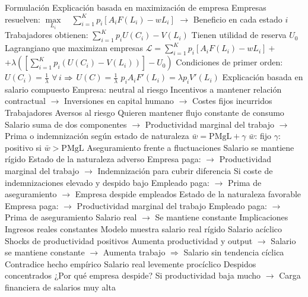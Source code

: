 \documentclass{nuevotema}
\begin{document}
\begin{esquemal}
		\2 Formulación
			\3 Explicación basada en maximización de empresa
				\4 Empresas resuelven:
				\4[] $\underset{L_i}{\max} \quad \sum_{i=1}^K p_i \left[ A_i F(L_i) - w L_i \right]$
				\4[] $\to$ Beneficio en cada estado $i$
				\4 Trabajadores obtienen:
				\4[] $\sum_{i=1}^K p_i U(C_i) - V(L_i) $
				\4[] Tienen utilidad de reserva $U_0$
				\4 Lagrangiano que maximizan empresas
				\4[] $\mathcal{L} = \sum_{i=1}^K p_i \left[ A_i F(L_i) - w L_i \right] +$
				\4[] $ + \lambda \left( \left[ \sum_{i=1}^K p_i ( U(C_i) - V(L_i) ) \right] - U_0 \right)$
				\4 Condiciones de primer orden:
				\4[] $U(C_i) = \frac{1}{\lambda}$ $\forall \, i$ $\then$ $U(C) = \frac{1}{\lambda}$
				\4[] $p_i A_i F'(L_i) = \lambda p_i V' (L_i)$
				\4[] 
			\3 Explicación basada en salario compuesto
				\4 Empresa:
				\4[] neutral al riesgo
				\4[] Incentivos a mantener relación contractual
				\4[] $\to$ Inversiones en capital humano
				\4[] $\to$ Costes fijos incurridos
				\4 Trabajadores
				\4[] Aversos al riesgo
				\4[] Quieren mantener flujo constante de consumo
				\4 Salario suma de dos componentes
				\4[] $\to$ Productividad marginal del trabajo
				\4[] $\to$ Prima o indemnización según estado de naturaleza
				\4[$\Rightarrow$] $\bar{w} = \text{PMgL} + \gamma$
				\4[] $\bar{w}$: fijo
				\4[] $\gamma$: positivo si $\bar{w} > \text{PMgL}$
				\4[$\then$] Aseguramiento frente a fluctuaciones
				\4[$\then$] Salario se mantiene rígido
				\4 Estado de la naturaleza adverso
				\4[] Empresa paga:
				\4[] $\to$ Productividad marginal del trabajo
				\4[] $\to$ Indemnización para cubrir diferencia
				\4[] Si coste de indemnizaciones elevado y despido bajo
				\4[] Empleado paga:
				\4[] $\to$ Prima de aseguramiento
				\4[] $\to$ Empresa despide empleados
				\4 Estado de la naturaleza favorable
				\4[] Empresa paga:
				\4[] $\to$ Productividad marginal del trabajo
				\4[] Empleado paga:
				\4[] $\to$ Prima de aseguramiento
				\4[] Salario real
				\4[] $\to$ Se mantiene constante
		\2 Implicaciones
			\3 Ingresos reales constantes
				\4 Modelo muestra salario real rígido
			\3 Salario acíclico
				\4 Shocks de productividad positivos
				\4[] Aumenta productividad y output
				\4[] $\to$ Salario se mantiene constante
				\4[] $\to$ Aumenta trabajo
				\4[] $\Rightarrow$ Salario sin tendencia cíclica
				\4 Contradice hecho empírico
				\4[] Salario real levemente procíclico
			\3 Despidos concentrados
				\4 ¿Por qué empresa despide?
				\4[] Si productividad baja mucho
				\4[] $\to$ Carga financiera de salarios muy alta

\end{esquemal}
\end{document}
